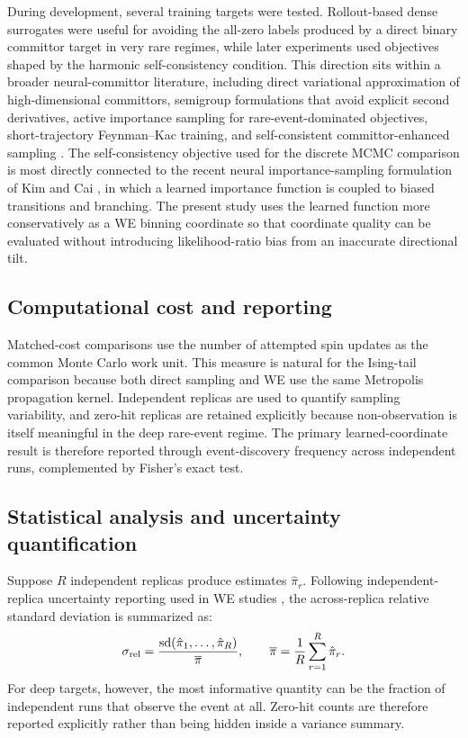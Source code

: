 \documentclass[a4paper,fleqn]{cas-sc}
\begin{document}
During development, several training targets were tested. Rollout-based dense surrogates were useful for avoiding the all-zero labels produced by a direct binary committor target in very rare regimes, while later experiments used objectives shaped by the harmonic self-consistency condition. This direction sits within a broader neural-committor literature, including direct variational approximation of high-dimensional committors, semigroup formulations that avoid explicit second derivatives, active importance sampling for rare-event-dominated objectives, short-trajectory Feynman--Kac training, and self-consistent committor-enhanced sampling \citep{khoo2019,li2022,rotskoff2022,strahan2023,kang2024,trizio2025}. The self-consistency objective used for the discrete MCMC comparison is most directly connected to the recent neural importance-sampling formulation of Kim and Cai \citep{kimcai2026}, in which a learned importance function is coupled to biased transitions and branching. The present study uses the learned function more conservatively as a WE binning coordinate so that coordinate quality can be evaluated without introducing likelihood-ratio bias from an inaccurate directional tilt.

\subsection{Computational cost and reporting}
Matched-cost comparisons use the number of attempted spin updates as the common Monte Carlo work unit. This measure is natural for the Ising-tail comparison because both direct sampling and WE use the same Metropolis propagation kernel. Independent replicas are used to quantify sampling variability, and zero-hit replicas are retained explicitly because non-observation is itself meaningful in the deep rare-event regime. The primary learned-coordinate result is therefore reported through event-discovery frequency across independent runs, complemented by Fisher's exact test.

\subsection{Statistical analysis and uncertainty quantification}\label{sec:stats}
Suppose $R$ independent replicas produce estimates $\hat\pi_r$. Following independent-replica uncertainty reporting used in WE studies \citep{zuckerman2017,russo2022}, the across-replica relative standard deviation is summarized as:
\begin{equation}
 \sigma_{\rm rel}=\frac{\mathrm{sd}(\hat\pi_1,\ldots,\hat\pi_R)}{\overline{\pi}},
 \qquad
 \overline{\pi}=\frac{1}{R}\sum_{r=1}^{R}\hat\pi_r.
\end{equation}
For deep targets, however, the most informative quantity can be the fraction of independent runs that observe the event at all. Zero-hit counts are therefore reported explicitly rather than being hidden inside a variance summary.
\end{document}
